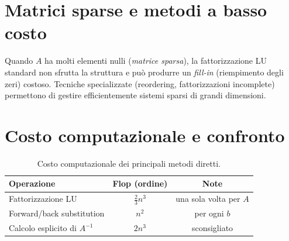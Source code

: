 \section{Matrici sparse e metodi a basso costo}
\label{sec:sparse}

Quando $A$ ha molti elementi nulli (\emph{matrice sparsa}), la fattorizzazione LU
standard non sfrutta la struttura e può produrre un \emph{fill-in} (riempimento
degli zeri) costoso. Tecniche specializzate (reordering, fattorizzazioni incomplete)
permettono di gestire efficientemente sistemi sparsi di grandi dimensioni.

\section{Costo computazionale e confronto}
\label{sec:costo_diretti}

\begin{table}[htbp]
  \centering
  \caption{Costo computazionale dei principali metodi diretti.}
  \label{tab:costo}
  \begin{tabular}{lcc}
    \toprule
    \textbf{Operazione} & \textbf{Flop (ordine)} & \textbf{Note} \\
    \midrule
    Fattorizzazione LU             & $\tfrac{2}{3}n^3$ & una sola volta per $A$ \\
    Forward/back substitution      & $n^2$             & per ogni $b$ \\
    Calcolo esplicito di $A^{-1}$  & $2n^3$            & sconsigliato \\
    \bottomrule
  \end{tabular}
\end{table}
